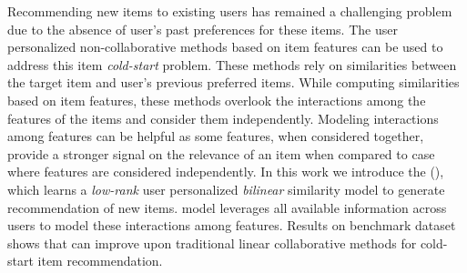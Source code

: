 Recommending new items to existing users has remained a challenging problem
due to the absence of user's past preferences for these items.  
The user personalized non-collaborative methods based on item features 
can be used to address this item \emph{cold-start} problem. 
These methods rely on similarities between the target item and user's previous preferred items. 
While computing similarities based on item features, these
methods overlook the interactions among the features of the items and 
consider them independently. Modeling interactions among features can be helpful 
as some features, when considered together, provide a stronger signal on the 
relevance of an item when compared to case where features are considered independently. 
In this work we introduce the \CFEXPB 
(\CF), which learns a \emph{low-rank} user personalized \emph{bilinear} similarity model to
generate \TOPN recommendation of new items. \CF model leverages all available
information across users to model these interactions among features.
Results on benchmark
dataset shows that \CF can improve upon traditional linear collaborative methods for
cold-start \TOPN item recommendation.